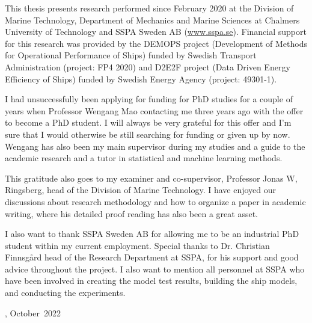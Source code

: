 This thesis presents research performed since February 2020 at the Division of Marine Technology, Department of Mechanics and Marine Sciences at Chalmers University of Technology and SSPA Sweden AB (\href{www.sspa.se}{www.sspa.se}). Financial support for this research was provided by the DEMOPS project (Development of Methods for Operational Performance of Ships) funded by Swedish Transport Administration (project: FP4 2020) and D2E2F project (Data Driven Energy Efficiency of Ships) funded by Swedish Energy Agency (project: 49301-1).

I had unsuccessfully been applying for funding for PhD studies for a couple of years when Professor Wengang Mao contacting me three years ago with the offer to become a PhD student. I will always be very grateful for this offer and I'm sure that I would otherwise be still searching for funding or given up by now. Wengang has also been my main supervisor during my studies and a guide to the academic research and a tutor in statistical and machine learning methods.  

This gratitude also goes to my examiner and co-supervisor, Professor Jonas W, Ringsberg,
head of the Division of Marine Technology. I have enjoyed our discussions about research methodology and how to organize a paper in academic writing, where his detailed proof reading has also been a great asset.

I also want to thank SSPA Sweden AB for allowing me to be an industrial PhD student within my current employment. Special thanks to Dr. Christian Finnsgård head of the Research Department at SSPA, for his support and good advice throughout the project. I also want to mention all personnel at SSPA who have been involved in creating the model test results, building the ship models, and conducting the experiments.

\vskip 2pc

\noindent \thesisauthor

\noindent \thesiscity, October\  2022  %
